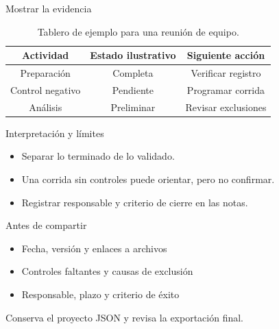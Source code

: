 \documentclass[aspectratio=169,11pt]{beamer}
\begin{document}
\begin{frame}{Mostrar la evidencia}
  \transdissolve[duration=0.25]
  \begin{table}
    \centering
    \caption{Tablero de ejemplo para una reunión de equipo.}
    \begin{tabular}{ccc}
      \toprule
      \textbf{Actividad} & \textbf{Estado ilustrativo} & \textbf{Siguiente acción} \\
      \midrule
      Preparación & Completa & Verificar registro \\
      Control negativo & Pendiente & Programar corrida \\
      Análisis & Preliminar & Revisar exclusiones \\
      \bottomrule
    \end{tabular}
  \end{table}
\end{frame}

\begin{frame}{Interpretación y límites}
  \transdissolve[duration=0.25]
  \begin{itemize}
    \item Separar lo terminado de lo validado.
    \item Una corrida sin controles puede orientar, pero no confirmar.
    \item Registrar responsable y criterio de cierre en las notas.
  \end{itemize}
\end{frame}

\begin{frame}{Antes de compartir}
  \transdissolve[duration=0.25]
  \begin{itemize}
    \item Fecha, versión y enlaces a archivos
    \item Controles faltantes y causas de exclusión
    \item Responsable, plazo y criterio de éxito
  \end{itemize}
  \medskip

  {\small Conserva el proyecto JSON y revisa la exportación final.}
\end{frame}
\end{document}
